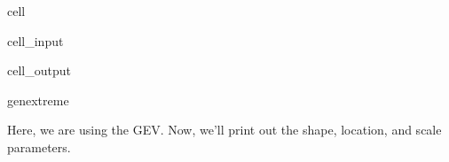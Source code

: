 \documentclass[letterpaper,10pt,english]{jupyterBook}
\begin{document}
\begin{sphinxuseclass}{cell}\begin{sphinxVerbatimInput}

\begin{sphinxuseclass}{cell_input}
\begin{sphinxVerbatim}[commandchars=\\\{\}]

\end{sphinxVerbatim}

\end{sphinxuseclass}\end{sphinxVerbatimInput}
\begin{sphinxVerbatimOutput}

\begin{sphinxuseclass}{cell_output}
\begin{sphinxVerbatim}[commandchars=\\\{\}]
genextreme
\end{sphinxVerbatim}

\end{sphinxuseclass}\end{sphinxVerbatimOutput}

\end{sphinxuseclass}
\sphinxAtStartPar
Here, we are using the GEV. Now, we’ll print out the shape, location, and scale parameters.
\end{document}
